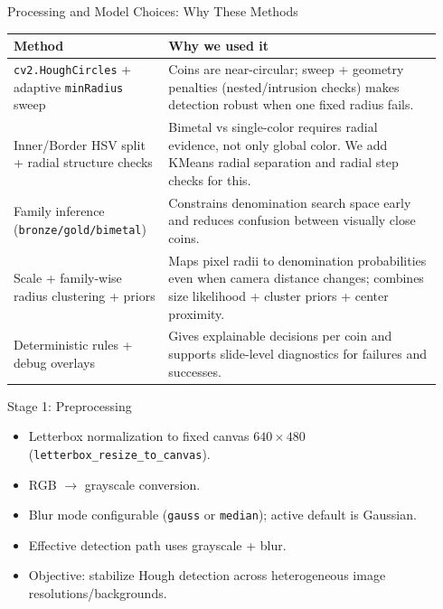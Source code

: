 \documentclass[aspectratio=169]{beamer}
\begin{document}
\begin{frame}{Processing and Model Choices: Why These Methods}
  \begin{tabular}{@{}p{0.34\linewidth}p{0.60\linewidth}@{}}
    \toprule
    Method & Why we used it \\
    \midrule
    \texttt{cv2.HoughCircles} + adaptive \texttt{minRadius} sweep & Coins are near-circular; sweep + geometry penalties (nested/intrusion checks) makes detection robust when one fixed radius fails. \\
    Inner/Border HSV split + radial structure checks & Bimetal vs single-color requires radial evidence, not only global color. We add KMeans radial separation and radial step checks for this. \\
    Family inference (\texttt{bronze/gold/bimetal}) & Constrains denomination search space early and reduces confusion between visually close coins. \\
    Scale + family-wise radius clustering + priors & Maps pixel radii to denomination probabilities even when camera distance changes; combines size likelihood + cluster priors + center proximity. \\
    Deterministic rules + debug overlays & Gives explainable decisions per coin and supports slide-level diagnostics for failures and successes. \\
    \bottomrule
  \end{tabular}
\end{frame}

\begin{frame}{Stage 1: Preprocessing}
  \begin{itemize}
    \item Letterbox normalization to fixed canvas \(640 \times 480\) (\texttt{letterbox\_resize\_to\_canvas}).
    \item RGB \(\rightarrow\) grayscale conversion.
    \item Blur mode configurable (\texttt{gauss} or \texttt{median}); active default is Gaussian.
    \item Effective detection path uses grayscale + blur.
    \item Objective: stabilize Hough detection across heterogeneous image resolutions/backgrounds.
  \end{itemize}
\end{frame}
\end{document}
